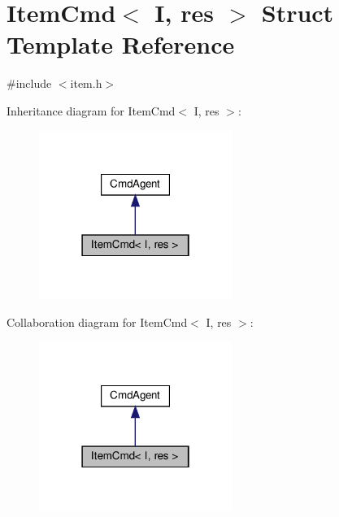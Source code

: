 \hypertarget{structItemCmd}{}\section{Item\+Cmd$<$ I, res $>$ Struct Template Reference}
\label{structItemCmd}


{\ttfamily \#include $<$item.\+h$>$}



Inheritance diagram for Item\+Cmd$<$ I, res $>$\+:\nopagebreak
\begin{figure}[H]
\begin{center}
\leavevmode
\includegraphics[width=178pt]{structItemCmd__inherit__graph}
\end{center}
\end{figure}


Collaboration diagram for Item\+Cmd$<$ I, res $>$\+:\nopagebreak
\begin{figure}[H]
\begin{center}
\leavevmode
\includegraphics[width=178pt]{structItemCmd__coll__graph}
\end{center}
\end{figure}
